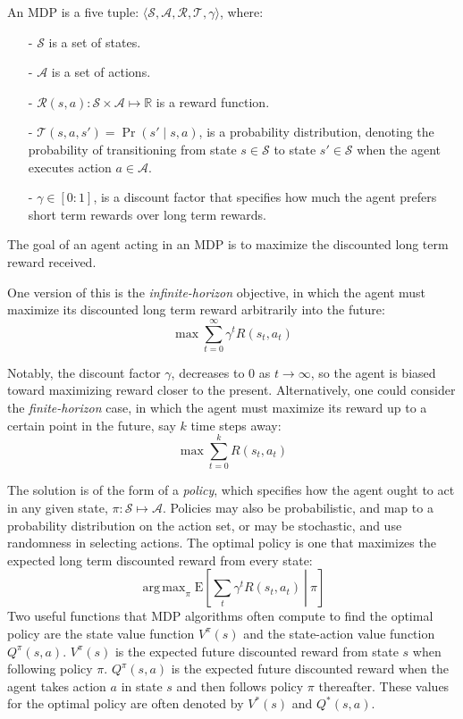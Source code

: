 \documentclass[11pt]{article}
\DeclareMathOperator*{\argmax}{arg\,max}
\begin{document}
An MDP is a five tuple: $\langle \mathcal{S}, \mathcal{A}, \mathcal{R}, \mathcal{T}, \gamma \rangle$, where:
\begin{itemize}
\item[-] $\mathcal{S}$ is a set of states.
\item[-] $\mathcal{A}$ is a set of actions.
\item[-] $\mathcal{R}(s,a) : \mathcal{S} \times \mathcal{A} \mapsto \mathbb{R}$ is a reward function.
\item[-] $\mathcal{T}(s,a,s') = \Pr(s' \mid s, a)$, is a probability distribution, denoting the probability of transitioning from state $s \in \mathcal{S}$ to state $s' \in \mathcal{S}$ when the agent executes action $a \in \mathcal{A}$.
\item[-] $\gamma \in [0:1]$, is a discount factor that specifies how much the agent prefers short term rewards over long term rewards.
\end{itemize}

The goal of an agent acting in an MDP is to maximize the discounted long term reward received. 

One version of this is the {\it infinite-horizon} objective, in which the agent must maximize its discounted long term reward arbitrarily into the future:
\begin{equation}
\max \sum_{t=0}^{\infty} \gamma^t R(s_t,a_t)
\end{equation}

Notably, the discount factor $\gamma$, decreases to $0$ as $t \rightarrow \infty$, so the agent is biased toward maximizing reward closer to the present. Alternatively, one could consider the {\it finite-horizon} case, in which the agent must maximize its reward up to a certain point in the future, say $k$ time steps away:
\begin{equation}
\max \sum_{t=0}^{k} R(s_t,a_t)
\end{equation}

The solution is of the form of a {\it policy}, which specifies how the agent ought to act in any given state, $\pi : \mathcal{S} \mapsto \mathcal{A}$. Policies may also be probabilistic, and map to a probability distribution on the action set, or may be stochastic, and use randomness in selecting actions. The optimal policy is one that maximizes the expected long term discounted reward from every state:
\begin{equation}
\argmax_\pi \left.\text{E}\left[\sum_t \gamma^t R(s_t,a_t)\ \right|\ \pi\right]
\end{equation}
Two useful functions that MDP algorithms often compute to find the optimal policy are the state value function $V^{\pi}(s)$ and the state-action value function $Q^{\pi}(s, a)$. $V^{\pi}(s)$ is the expected future discounted reward from state $s$ when following policy $\pi$. $Q^{\pi}(s, a)$ is the expected future discounted reward when the agent takes action $a$ in state $s$ and then follows policy $\pi$ thereafter. These values for the optimal policy are often denoted by $V^*(s)$ and $Q^*(s, a)$.
\end{document}
